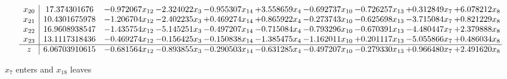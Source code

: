 \documentclass[10pt]{article}
\begin{document}
\[\begin{array}{c| c c@{\hskip 2pt} c@{\hskip 2pt} c@{\hskip 2pt} c@{\hskip 2pt} c@{\hskip 2pt} c@{\hskip 2pt} c@{\hskip 2pt} c@{\hskip 2pt} }
 x_{20}   &  17.374301676 & -0.972067 x_{12} & -2.324022 x_{3} & -0.955307 x_{14} & + 3.558659 x_{4} & -0.692737 x_{10} & -0.726257 x_{13} & + 0.312849 x_{7} & + 6.078212 x_{8}\\
 x_{21}   &  10.4301675978 & -1.206704 x_{12} & -2.402235 x_{3} & + 0.469274 x_{14} & + 0.865922 x_{4} & -0.273743 x_{10} & -0.625698 x_{13} & -3.715084 x_{7} & + 0.821229 x_{8}\\
 x_{22}   &  16.9608938547 & -1.435754 x_{12} & -5.145251 x_{3} & -0.497207 x_{14} & -0.715084 x_{4} & -0.793296 x_{10} & -0.670391 x_{13} & -4.480447 x_{7} & + 2.379888 x_{8}\\
 x_{23}   &  13.1117318436 & -0.469274 x_{12} & -0.156425 x_{3} & -0.150838 x_{14} & -1.385475 x_{4} & -1.162011 x_{10} & + 0.201117 x_{13} & -5.055866 x_{7} & + 0.486034 x_{8}\\
\hline
z    &  6.06703910615 & -0.681564 x_{12} & -0.893855 x_{3} & -0.290503 x_{14} & -0.631285 x_{4} & -0.497207 x_{10} & -0.279330 x_{13} & + 0.966480 x_{7} & + 2.491620 x_{8}\\
\end{array}\]


 $ x_{7} $ enters and $ x_{18} $ leaves 
\end{document}
